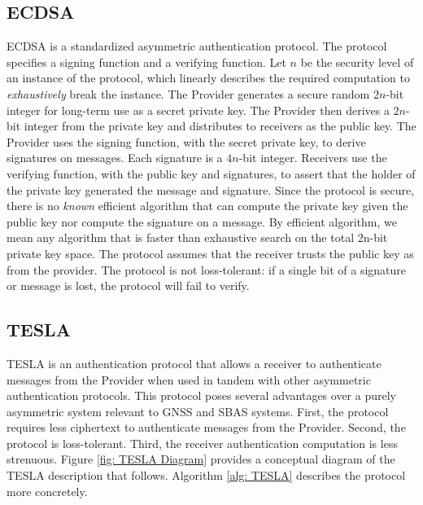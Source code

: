 \documentclass[letterpaper,times]{IONconf/IONconf}
\begin{document}
\subsection{ECDSA}
ECDSA is a standardized asymmetric authentication protocol.
The protocol specifies a signing function and a verifying function.
Let $n$ be the security level of an instance of the protocol, which linearly describes the required computation to {\em exhaustively} break the instance.
The Provider generates a secure random $2n$-bit integer for long-term use as a secret private key.
The Provider then derives a $2n$-bit integer from the private key and distributes to receivers as the public key.
The Provider uses the signing function, with the secret private key, to derive signatures on messages.
Each signature is a $4n$-bit integer.
Receivers use the verifying function, with the public key and signatures, to assert that the holder of the private key generated the message and signature.
Since the protocol is secure, there is no {\em known} efficient algorithm that can compute the private key given the public key nor compute the signature on a message.
By efficient algorithm, we mean any algorithm that is faster than exhaustive search on the total 2n-bit private key space.
The protocol assumes that the receiver trusts the public key as from the provider.
The protocol is not loss-tolerant: if a single bit of a signature or message is lost, the protocol will fail to verify.

\subsection{TESLA} \label{sec: TESLA intro}

TESLA is an authentication protocol that allows a receiver to authenticate messages from the Provider when used in tandem with other asymmetric authentication protocols.
This protocol poses several advantages over a purely asymmetric system relevant to GNSS and SBAS systems.
First, the protocol requires less ciphertext to authenticate messages from the Provider.
Second, the protocol is loss-tolerant.
Third, the receiver authentication computation is less strenuous.
Figure \ref{fig: TESLA Diagram} provides a conceptual diagram of the TESLA description that follows.
Algorithm \ref{alg: TESLA} describes the protocol more concretely.
\end{document}
